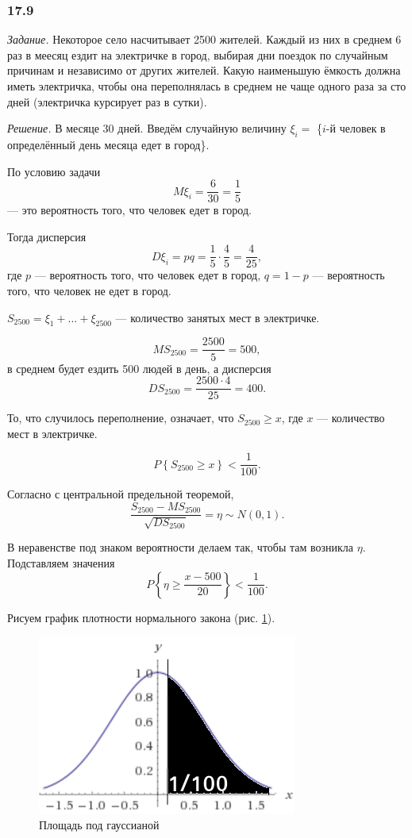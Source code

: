 \subsubsection{17.9}

\textit{Задание.} Некоторое село насчитывает 2500 жителей.
Каждый из них в среднем 6 раз в меесяц ездит на электричке в город,
выбирая дни поездок по случайным причинам и независимо от других жителей.
Какую наименьшую ёмкость должна иметь электричка,
чтобы она переполнялась в среднем не чаще одного раза за сто дней
(электричка курсирует раз в сутки).

\textit{Решение.} В месяце 30 дней.
Введём случайную величину $ \xi_i =$ \{$i$-й человек в определённый день месяца едет в город\}.

По условию задачи
$$M \xi_i =
  \frac{6}{30} =
  \frac{1}{5}$$
--- это вероятность того, что человек едет в город.

Тогда дисперсия
$$D \xi_i =
  pq =
  \frac{1}{5} \cdot \frac{4}{5} =
  \frac{4}{25},$$
где $p$ --- вероятность того, что человек едет в город, $q = 1 - p$ --- вероятность того,
что человек не едет в город.

$S_{2500} = \xi_1 + \dotsc + \xi_{2500}$ --- количество занятых мест в электричке.

$$MS_{2500} =
  \frac{2500}{5} =
  500,$$
в среднем будет ездить 500 людей в день, а дисперсия
$$DS_{2500} =
  \frac{2500 \cdot 4}{25} =
  400.$$

То, что случилось переполнение, означает, что $S_{2500} \geq x$, где $x$ ---
количество мест в электричке.

$$P \left\{ S_{2500} \geq x \right\} <
  \frac{1}{100}.$$

Согласно с центральной предельной теоремой,
$$ \frac{S_{2500} - MS_{2500}}{ \sqrt{DS_{2500}}} =
  \eta \sim
  N \left( 0, 1 \right).$$

В неравенстве под знаком вероятности делаем так, чтобы там возникла $ \eta $.
Подставляем значения
$$P \left\{ \eta \geq \frac{x - 500}{20} \right\} <
  \frac{1}{100}.$$

Рисуем график плотности нормального закона (рис. \ref{fig:179}).

\begin{figure}[h!]
  \centering
  \includegraphics[width=.4\textwidth]{./pictures/17_9.png}
  \caption{Площадь под гауссианой}
  \label{fig:179}
\end{figure}

